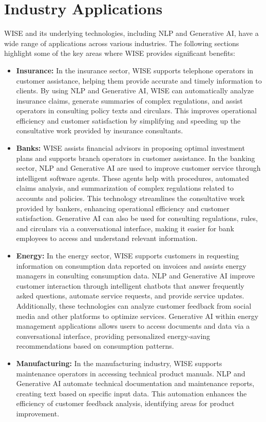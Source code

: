 \section{Industry Applications}

WISE and its underlying technologies, including NLP and Generative AI, have a wide range of applications across various industries. The following sections highlight some of the key areas where WISE provides significant benefits:

\begin{itemize}
    \item \textbf{Insurance:} In the insurance sector, WISE supports telephone operators in customer assistance, helping them provide accurate and timely information to clients. By using NLP and Generative AI, WISE can automatically analyze insurance claims, generate summaries of complex regulations, and assist operators in consulting policy texts and circulars. This improves operational efficiency and customer satisfaction by simplifying and speeding up the consultative work provided by insurance consultants.
    \item \textbf{Banks:} WISE assists financial advisors in proposing optimal investment plans and supports branch operators in customer assistance. In the banking sector, NLP and Generative AI are used to improve customer service through intelligent software agents. These agents help with procedures, automated claims analysis, and summarization of complex regulations related to accounts and policies. This technology streamlines the consultative work provided by bankers, enhancing operational efficiency and customer satisfaction.
    Generative AI can also be used for consulting regulations, rules, and circulars via a conversational interface, making it easier for bank employees to access and understand relevant information.
    \item \textbf{Energy:} In the energy sector, WISE supports customers in requesting information on consumption data reported on invoices and assists energy managers in consulting consumption data. NLP and Generative AI improve customer interaction through intelligent chatbots that answer frequently asked questions, automate service requests, and provide service updates. Additionally, these technologies can analyze customer feedback from social media and other platforms to optimize services.
    Generative AI within energy management applications allows users to access documents and data via a conversational interface, providing personalized energy-saving recommendations based on consumption patterns.
    \item \textbf{Manufacturing:} In the manufacturing industry, WISE supports maintenance operators in accessing technical product manuals. NLP and Generative AI automate technical documentation and maintenance reports, creating text based on specific input data. This automation enhances the efficiency of customer feedback analysis, identifying areas for product improvement.


\end{itemize}

